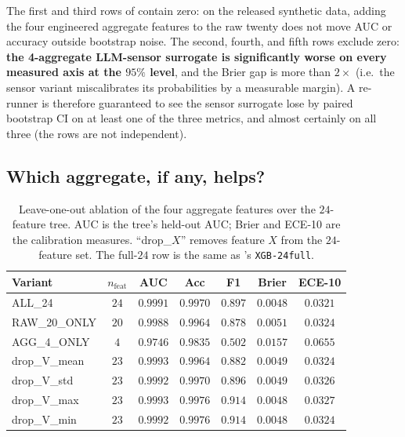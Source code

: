 The first and third rows of  contain zero:
on the released synthetic data, adding the four engineered aggregate
features to the raw twenty does not move AUC or accuracy outside
bootstrap noise. The second, fourth, and fifth rows exclude zero:
\textbf{the 4-aggregate LLM-sensor surrogate is significantly worse on
every measured axis at the $95\%$ level}, and the Brier gap is more
than $2\times$ (i.e.\ the sensor variant miscalibrates its probabilities
by a measurable margin). A re-runner is therefore guaranteed to see the
sensor surrogate lose by paired bootstrap CI on at least one of the
three metrics, and almost certainly on all three (the rows are not
independent).

\subsection{Which aggregate, if any, helps?}

\begin{table}[t]
\centering
\small
\caption{Leave-one-out ablation of the four aggregate features over
the $24$-feature tree. AUC is the tree's held-out AUC; Brier and ECE-10
are the calibration measures. ``drop\_$X$'' removes feature $X$ from
the $24$-feature set. The full-$24$ row is the same as
's \texttt{XGB-24full}.}
\label{tab:p8-evidence-abl}
\begin{tabular}{lcccccc}
\toprule
Variant & $n_{\text{feat}}$ & AUC & Acc & F1 & Brier & ECE-10 \\
\midrule
ALL\_24         & $24$ & $0.9991$ & $0.9970$ & $0.897$ & $0.0048$ & $0.0321$ \\
RAW\_20\_ONLY   & $20$ & $0.9988$ & $0.9964$ & $0.878$ & $0.0051$ & $0.0324$ \\
AGG\_4\_ONLY    & $4$  & $0.9746$ & $0.9835$ & $0.502$ & $0.0157$ & $0.0655$ \\
drop\_V\_mean   & $23$ & $0.9993$ & $0.9964$ & $0.882$ & $0.0049$ & $0.0324$ \\
drop\_V\_std    & $23$ & $0.9992$ & $0.9970$ & $0.896$ & $0.0049$ & $0.0326$ \\
drop\_V\_max    & $23$ & $0.9993$ & $0.9976$ & $0.914$ & $0.0048$ & $0.0327$ \\
drop\_V\_min    & $23$ & $0.9992$ & $0.9976$ & $0.914$ & $0.0048$ & $0.0324$ \\
\bottomrule
\end{tabular}
\end{table}

